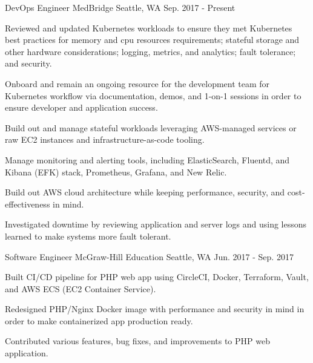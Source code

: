 


\begin{cventries}


\cventry
{DevOps Engineer} %
{MedBridge} %
{Seattle, WA} %
{Sep. 2017 - Present} %
{ %
\begin{cvitems}
\item {Reviewed and updated Kubernetes workloads to ensure they met Kubernetes best practices for memory and cpu resources requirements; stateful storage and other hardware considerations; logging, metrics, and analytics; fault tolerance; and security.}
\item {Onboard and remain an ongoing resource for the development team for Kubernetes workflow via documentation, demos, and 1-on-1 sessions in order to ensure developer and application success.}
\item {Build out and manage stateful workloads leveraging AWS-managed services or raw EC2 instances and infrastructure-as-code tooling.}
\item {Manage monitoring and alerting tools, including ElasticSearch, Fluentd, and Kibana (EFK) stack, Prometheus, Grafana, and New Relic.}
\item {Build out AWS cloud architecture while keeping performance, security, and cost-effectiveness in mind.}
\item {Investigated downtime by reviewing application and server logs and using lessons learned to make systems more fault tolerant.}
\end{cvitems}
}


\cventry
{Software Engineer} %
{McGraw-Hill Education} %
{Seattle, WA} %
{Jun. 2017 - Sep. 2017} %
{ %
\begin{cvitems}
\item {Built CI/CD pipeline for PHP web app using CircleCI, Docker, Terraform, Vault, and AWS ECS (EC2 Container Service).}
\item {Redesigned PHP/Nginx Docker image with performance and security in mind in order to make containerized app production ready.}
\item {Contributed various features, bug fixes, and improvements to PHP web application.}
\end{cvitems}
}


\end{cventries}
